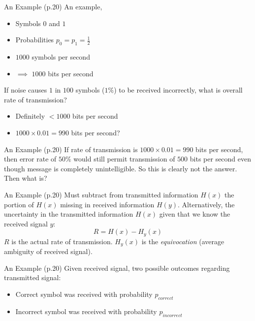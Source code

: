 \documentclass{beamer}
\begin{document}
  \begin{frame}{An Example \small (p.20)}
    An example,
    \begin{itemize}
      \item Symbols $0$ and $1$
      \item Probabilities $p_0 = p_1 = \frac{1}{2}$
      \item $1000$ symbols per second
      \item $\implies$ $1000$ bits per second
    \end{itemize}
    If noise causes $1$ in $100$ symbols ($1\%$) to be received incorrectly,
    what is overall rate of transmission?
    \begin{itemize}
      \item Definitely $< 1000$ bits per second
      \item $1000 \times 0.01 = 990$ bits per second?
    \end{itemize}
  \end{frame}

  \begin{frame}{An Example \small (p.20)}
    If rate of transmission is $1000 \times 0.01 = 990$ bits per second, then
    error rate of $50\%$ would still permit transmission of $500$ bits per
    second even though message is completely unintelligible.  So this is
    clearly not the answer.  Then what is?
  \end{frame}

  \begin{frame}{An Example \small (p.20)}
    Must subtract from transmitted information $H(x)$ the portion of $H(x)$
    missing in received information $H(y)$.  Alternatively, the uncertainty in
    the transmitted information $H(x)$ given that we know the received signal
    $y$:
    \begin{equation}
      R = H(x) - H_y(x)
    \end{equation}
    $R$ is the actual rate of transmission.  $H_y(x)$ is the
    \emph{equivocation} (average ambiguity of received signal).
  \end{frame}

  \begin{frame}{An Example \small (p.20)}
    Given received signal, two possible outcomes regarding transmitted signal:
    \begin{itemize}
      \item Correct symbol was received with probability $p_{correct}$
      \item Incorrect symbol was received with probability $p_{incorrect}$
    \end{itemize}
  \end{frame}
\end{document}
